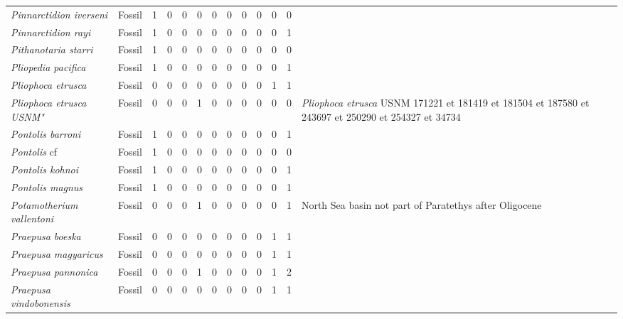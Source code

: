\begin{longtable}{llccccccccccp{}}
\textit{Pinnarctidion iverseni} &
Fossil &
1 &
0 &
0 &
0 &
0 &
0 &
0 &
0 &
0 &
0 &
\\

\textit{Pinnarctidion rayi} &
Fossil &
1 &
0 &
0 &
0 &
0 &
0 &
0 &
0 &
0 &
1 &
\\

\textit{Pithanotaria starri} &
Fossil &
1 &
0 &
0 &
0 &
0 &
0 &
0 &
0 &
0 &
0 &
\\

\textit{Pliopedia pacifica} &
Fossil &
1 &
0 &
0 &
0 &
0 &
0 &
0 &
0 &
0 &
1 &
\\

\textit{Pliophoca etrusca} &
Fossil &
0 &
0 &
0 &
0 &
0 &
0 &
0 &
0 &
1 &
1 &
\\

\textit{Pliophoca etrusca USNM"} &
Fossil &
0 &
0 &
0 &
1 &
0 &
0 &
0 &
0 &
0 &
0 &
\textit{Pliophoca etrusca} USNM 171221 et 181419 et 181504 et 187580 et 243697 et 250290 et 254327 et 34734\\

\textit{Pontolis barroni} &
Fossil &
1 &
0 &
0 &
0 &
0 &
0 &
0 &
0 &
0 &
1 &
\\

\textit{Pontolis} cf &
Fossil &
1 &
0 &
0 &
0 &
0 &
0 &
0 &
0 &
0 &
0 &
\\

\textit{Pontolis kohnoi} &
Fossil &
1 &
0 &
0 &
0 &
0 &
0 &
0 &
0 &
0 &
1 &
\\

\textit{Pontolis magnus} &
Fossil &
1 &
0 &
0 &
0 &
0 &
0 &
0 &
0 &
0 &
1 &
\\

\textit{Potamotherium vallentoni} &
Fossil &
0 &
0 &
0 &
1 &
0 &
0 &
0 &
0 &
0 &
1 &
North Sea basin not part of Paratethys after Oligocene\\

\textit{Praepusa boeska} &
Fossil &
0 &
0 &
0 &
0 &
0 &
0 &
0 &
0 &
1 &
1 &
\\

\textit{Praepusa magyaricus} &
Fossil &
0 &
0 &
0 &
0 &
0 &
0 &
0 &
0 &
1 &
1 &
\\

\textit{Praepusa pannonica} &
Fossil &
0 &
0 &
0 &
1 &
0 &
0 &
0 &
0 &
1 &
2 &
\\

\textit{Praepusa vindobonensis} &
Fossil &
0 &
0 &
0 &
0 &
0 &
0 &
0 &
0 &
1 &
1 &
\\


\end{longtable}
